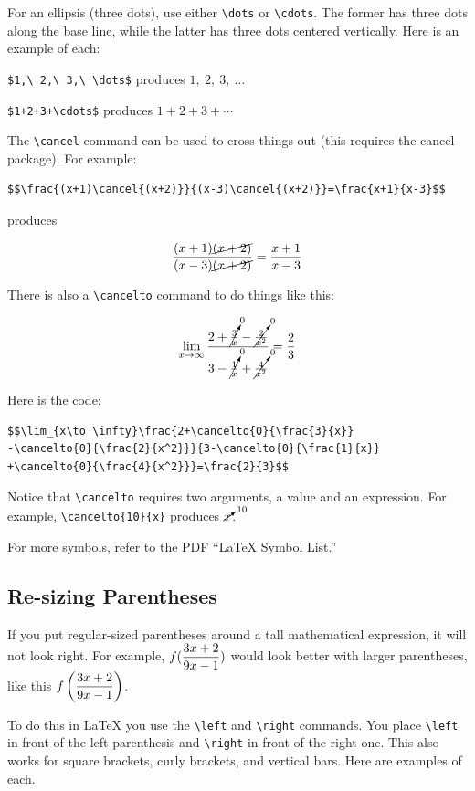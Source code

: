 \documentclass[12pt]{article}
\begin{document}
For an ellipsis (three dots), use either \verb|\dots| or \verb|\cdots|. The former has three dots along the base line, while the latter has three dots centered vertically. Here is an example of each:

\verb|$1,\ 2,\ 3,\ \dots$| produces $1,\ 2,\ 3,\ \dots$

\verb|$1+2+3+\cdots$| produces $1+2+3+\cdots$

The \verb|\cancel| command can be used to cross things out (this requires the cancel package). For example:

\begin{verbatim}
$$\frac{(x+1)\cancel{(x+2)}}{(x-3)\cancel{(x+2)}}=\frac{x+1}{x-3}$$
\end{verbatim}

produces

$$\frac{(x+1)\cancel{(x+2)}}{(x-3)\cancel{(x+2)}}=\frac{x+1}{x-3}$$

There is also a \verb|\cancelto| command to do things like this:

$$\lim_{x\to \infty}\frac{2+\cancelto{0}{\frac{3}{x}}-\cancelto{0}{\frac{2}{x^2}}}{3-\cancelto{0}{\frac{1}{x}}+\cancelto{0}{\frac{4}{x^2}}}=\frac{2}{3}$$

Here is the code:

\begin{verbatim}
$$\lim_{x\to \infty}\frac{2+\cancelto{0}{\frac{3}{x}}
-\cancelto{0}{\frac{2}{x^2}}}{3-\cancelto{0}{\frac{1}{x}}
+\cancelto{0}{\frac{4}{x^2}}}=\frac{2}{3}$$
\end{verbatim}

Notice that \verb|\cancelto| requires two arguments, a value and an expression. For example, \verb|\cancelto{10}{x}| produces $\cancelto{10}{x}$.

For more symbols, refer to the PDF ``LaTeX Symbol List.''

\subsection{Re-sizing Parentheses}

If you put regular-sized parentheses around a tall mathematical expression, it will not look right. For example, $\displaystyle f(\frac{3x+2}{9x-1})$ would look better with larger parentheses, like this $\displaystyle f\left(\frac{3x+2}{9x-1}\right)$.

To do this in \LaTeX{} you use the \verb|\left| and \verb|\right| commands. You place \verb|\left| in front of the left parenthesis and \verb|\right| in front of the right one. This also works for square brackets, curly brackets, and vertical bars. Here are examples of each.
\end{document}
